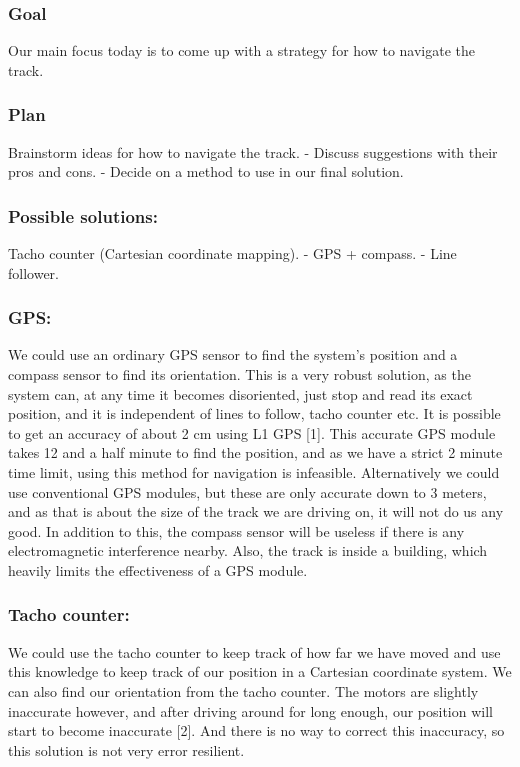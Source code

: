 \subsubsection{Goal}Our main focus today is to come up with a strategy for
how to navigate the track.


\subsubsection{Plan} Brainstorm ideas for how to navigate the track. -
Discuss suggestions with their pros and cons. - Decide on a method to
use in our final solution.


\subsubsection{Possible solutions:}
Tacho counter (Cartesian coordinate
mapping). - GPS + compass. - Line follower.

\subsubsection{GPS:}
We could use an ordinary GPS sensor to find the system's
position and a compass sensor to find its orientation. This is a very
robust solution, as the system can, at any time it becomes disoriented,
just stop and read its exact position, and it is independent of lines to
follow, tacho counter etc. It is possible to get an accuracy of about 2
cm using L1 GPS {[}1{]}.
This accurate GPS module takes 12 and a half
minute to find the position, and as we have a strict 2 minute time
limit, using this method for navigation is infeasible. Alternatively we
could use conventional GPS modules, but these are only accurate down to
3 meters, and as that is about the size of the track we are driving on,
it will not do us any good. In addition to this, the compass sensor will
be useless if there is any electromagnetic interference nearby. Also,
the track is inside a building, which heavily limits the effectiveness
of a GPS module.

\subsubsection{Tacho counter:}
We could use the tacho counter to keep track of
how far we have moved and use this knowledge to keep track of our
position in a Cartesian coordinate system. We can also find our
orientation from the tacho counter. The motors are slightly inaccurate
however, and after driving around for long enough, our position will
start to become inaccurate {[}2{]}. And there is no way to correct this
inaccuracy, so this solution is not very error resilient.

